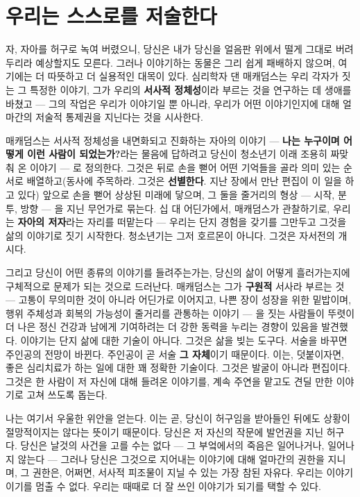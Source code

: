 \section*{우리는 스스로를 저술한다}

자, 자아를 허구로 녹여 버렸으니, 당신은 내가 당신을 얼음판 위에서 떨게 그대로 버려두리라 예상할지도 모른다. 그러나 이야기하는 동물은 그리 쉽게 패배하지 않으며, 여기에는 더 따뜻하고 더 실용적인 대목이 있다. 심리학자 댄 매캐덤스는 우리 각자가 짓는 그 특정한 이야기, 그가 우리의 \textbf{서사적 정체성}이라 부르는 것을 연구하는 데 생애를 바쳤고 — 그의 작업은 우리가 이야기일 뿐 아니라, 우리가 어떤 이야기인지에 대해 얼마간의 저술적 통제권을 지닌다는 것을 시사한다.

매캐덤스는 서사적 정체성을 내면화되고 진화하는 자아의 이야기 — \textbf{나는 누구이며 어떻게 이런 사람이 되었는가?}라는 물음에 답하려고 당신이 청소년기 이래 조용히 짜맞춰 온 이야기 — 로 정의한다. 그것은 뒤로 손을 뻗어 어떤 기억들을 골라 의미 있는 순서로 배열하고(동사에 주목하라. 그것은 \textbf{선별한다}. 지난 장에서 만난 편집이 이 일을 하고 있다) 앞으로 손을 뻗어 상상된 미래에 닿으며, 그 둘을 줄거리의 형상 — 시작, 분투, 방향 — 을 지닌 무언가로 묶는다. 십 대 어딘가에서, 매캐덤스가 관찰하기로, 우리는 \textbf{자아의 저자}라는 자리를 떠맡는다 — 우리는 단지 경험을 갖기를 그만두고 그것을 삶의 이야기로 짓기 시작한다. 청소년기는 그저 호르몬이 아니다. 그것은 자서전의 개시다.

그리고 당신이 어떤 종류의 이야기를 들려주는가는, 당신의 삶이 어떻게 흘러가는지에 구체적으로 문제가 되는 것으로 드러난다. 매캐덤스는 그가 \textbf{구원적} 서사라 부르는 것 — 고통이 무의미한 것이 아니라 어딘가로 이어지고, 나쁜 장이 성장을 위한 밑밥이며, 행위 주체성과 회복의 가능성이 줄거리를 관통하는 이야기 — 을 짓는 사람들이 뚜렷이 더 나은 정신 건강과 남에게 기여하려는 더 강한 동력을 누리는 경향이 있음을 발견했다. 이야기는 단지 삶에 대한 기술이 아니다. 그것은 삶을 빚는 도구다. 서술을 바꾸면 주인공의 전망이 바뀐다. 주인공이 곧 서술 \textbf{그 자체}이기 때문이다. 이는, 덧붙이자면, 좋은 심리치료가 하는 일에 대한 꽤 정확한 기술이다. 그것은 발굴이 아니라 편집이다. 그것은 한 사람이 저 자신에 대해 들려온 이야기를, 계속 주연을 맡고도 견딜 만한 이야기로 고쳐 쓰도록 돕는다.

나는 여기서 우울한 위안을 얻는다. 이는 곧, 당신이 허구임을 받아들인 뒤에도 상황이 절망적이지는 않다는 뜻이기 때문이다. 당신은 저 자신의 작문에 발언권을 지닌 허구다. 당신은 날것의 사건을 고를 수는 없다 — 그 부엌에서의 죽음은 일어나거나, 일어나지 않는다 — 그러나 당신은 그것으로 지어내는 이야기에 대해 얼마간의 권한을 지니며, 그 권한은, 어쩌면, 서사적 피조물이 지닐 수 있는 가장 참된 자유다. 우리는 이야기이기를 멈출 수 없다. 우리는 때때로 더 잘 쓰인 이야기가 되기를 택할 수 있다.

